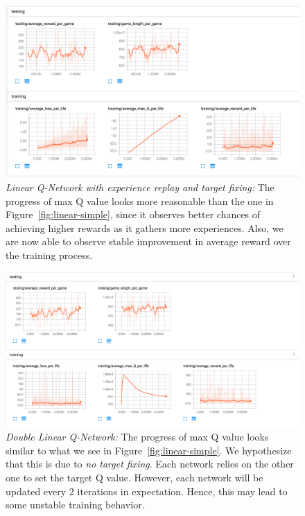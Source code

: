 \documentclass{article}
\begin{document}
\begin{figure}[h]
\centering
\includegraphics[width=\linewidth]{plots/linear.png}
\caption{{\em Linear Q-Network with experience replay and target fixing:} The progress of max Q value looks more reasonable than the one in Figure~\ref{fig:linear-simple}, since it observes better chances of achieving higher rewards as it gathers more experiences. Also, we are now able to observe stable improvement in average reward over the training process. } 
\label{fig:linear}
\end{figure}

\begin{figure}[h]
\centering
\includegraphics[width=\linewidth]{plots/linear_double.png}
\caption{{\em Double Linear Q-Network:} The progress of max Q value looks similar to what we see in Figure~\ref{fig:linear-simple}. We hypothesize that this is due to {\em no target fixing}. Each network relies on the other one to set the target Q value. However, each network will be updated every 2 iterations in expectation. Hence, this may lead to some unstable training behavior. }
\label{fig:double-linear}
\end{figure}
\end{document}
